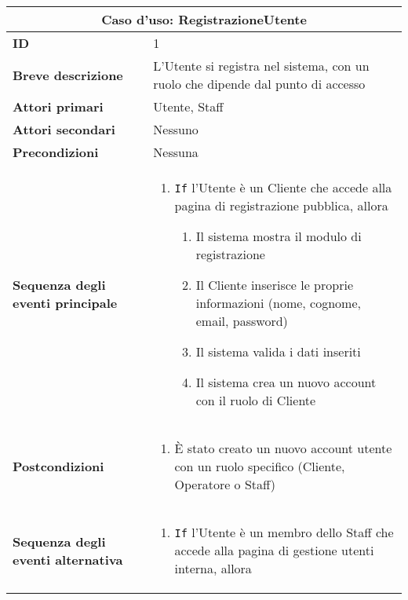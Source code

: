 \documentclass[a4paper]{report}
\begin{document}
\clearpage
\begin{table}[H]
\vspace*{-0cm}
\renewcommand{\arraystretch}{1.9}
\begin{tabular}{|p{3.9cm}|p{9.9cm}|}
\hline
\multicolumn{2}{|c|}{\textbf{Caso d’uso: RegistrazioneUtente}} \\ \hline
\textbf{ID} & 1 \\ \hline
\textbf{Breve descrizione} & L'Utente si registra nel sistema, con un ruolo che dipende dal punto di accesso \\ \hline
\textbf{Attori primari} & Utente, Staff \\ \hline
\textbf{Attori secondari} & Nessuno \\ \hline
\textbf{Precondizioni} & Nessuna \\ \hline
\textbf{Sequenza degli eventi principale} &
\begin{enumerate}[leftmargin=14pt,label=\arabic*.,labelsep=0.5em,topsep=0pt,partopsep=0pt,parsep=0pt,itemsep=0pt]
    \item \texttt{If} l'Utente è un Cliente che accede alla pagina di registrazione pubblica, allora
    \begin{enumerate}[label=\arabic{enumi}.\arabic*.,leftmargin=22pt,labelsep=0.5em,topsep=0pt,partopsep=0pt,parsep=0pt,itemsep=0pt]
        \item Il sistema mostra il modulo di registrazione
        \item Il Cliente inserisce le proprie informazioni (nome, cognome, email, password)
        \item Il sistema valida i dati inseriti
        \item Il sistema crea un nuovo account con il ruolo di Cliente
    \end{enumerate}
\end{enumerate}\\ \hline
\textbf{Postcondizioni} & 
\begin{enumerate}[leftmargin=14pt,label=\arabic*.,labelsep=0.5em,topsep=0pt,partopsep=0pt,parsep=0pt,itemsep=0pt]
\item È stato creato un nuovo account utente con un ruolo specifico (Cliente, Operatore o Staff) 
\end{enumerate} \\ \hline
\textbf{Sequenza degli eventi alternativa} & \begin{enumerate}[leftmargin=14pt,label=\arabic*.,labelsep=0.5em,topsep=0pt,partopsep=0pt,parsep=0pt,itemsep=0pt]
    \item \texttt{If} l'Utente è un membro dello Staff che accede alla pagina di gestione utenti interna, allora

\end{enumerate}
\end{tabular}
\end{table}
\end{document}

